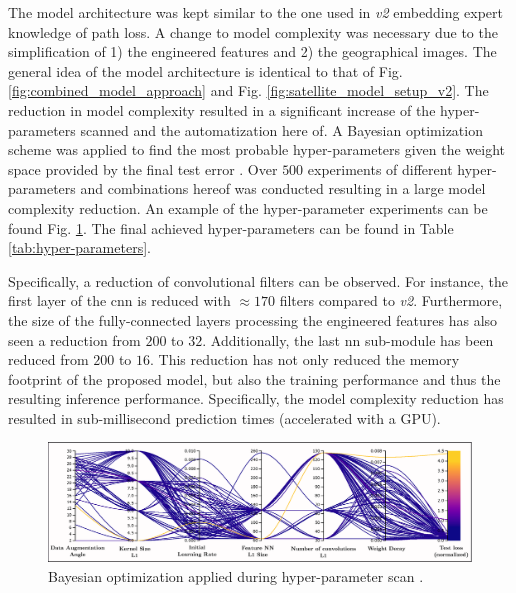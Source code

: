 The model architecture was kept similar to the one used in \emph{v2} embedding expert knowledge of path loss. A change to model complexity was necessary due to the simplification of 1) the engineered features and 2) the geographical images. The general idea of the model architecture is identical to that of Fig. \ref{fig:combined_model_approach} and Fig. \ref{fig:satellite_model_setup_v2}. The reduction in model complexity resulted in a significant increase of the hyper-parameters scanned and the automatization here of. A Bayesian optimization scheme was applied to find the most probable hyper-parameters given the weight space provided by the final test error \cite{YuHyper-ParameterApplications, wandb}. Over $500$ experiments of different hyper-parameters and combinations hereof was conducted resulting in a large model complexity reduction. An example of the hyper-parameter experiments can be found Fig. \ref{fig:hypar-paramters_scan}. The final achieved hyper-parameters can be found in Table \ref{tab:hyper-parameters}.

Specifically, a reduction of convolutional filters can be observed. For instance, the first layer of the \gls{cnn} is reduced with $\approx 170$ filters compared to \emph{v2}. Furthermore, the size of the fully-connected layers processing the engineered features has also seen a reduction from $200$ to $32$. Additionally, the last \gls{nn} sub-module has been reduced from $200$ to $16$. This reduction has not only reduced the memory footprint of the proposed model, but also the training performance and thus the resulting inference performance. Specifically, the model complexity reduction has resulted in sub-millisecond prediction times (accelerated with a GPU). 

\begin{figure}
    \centering
    \includegraphics{chapters/part_pathloss/osm_images_paper/figures/hyperparameter_scan.eps}
    \caption{Bayesian optimization applied during hyper-parameter scan \cite{wandb}.}
    \label{fig:hypar-paramters_scan}
\end{figure}


